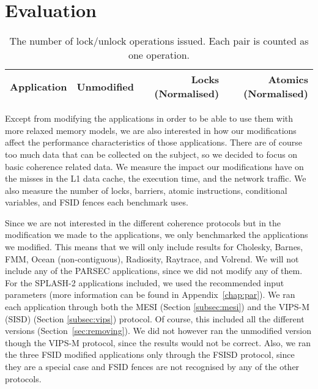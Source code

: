 \chapter{Evaluation}
\label{chap:results}

\begin{table}[b]
	\begin{centering}
		\begin{tabular}{ r | r r r }
			Application & Unmodified & Locks (Normalised) & Atomics (Normalised) \\
			\hline
		\end{tabular}
		\caption{The number of lock/unlock operations issued. Each pair is
		counted as one operation.}
		\label{tab:locks}
	\end{centering}
\end{table}

Except from modifying the applications in order to be able to use them with more
relaxed memory models, we are also interested in how our modifications affect
the performance characteristics of those applications. There are of course too
much data that can be collected on the subject, so we decided to focus on basic
coherence related data. We measure the impact our modifications have on the
misses in the L1 data cache, the execution time, and the network traffic. We
also measure the number of locks, barriers, atomic instructions, conditional
variables, and FSID fences each benchmark uses.

Since we are not interested in the different coherence protocols but in the
modification we made to the applications, we only benchmarked the applications
we modified. This means that we will only include results for Cholesky, Barnes,
FMM, Ocean (non-contiguous), Radiosity, Raytrace, and Volrend. We will not
include any of the PARSEC applications, since we did not modify any of them. For
the SPLASH-2 applications included, we used the recommended input parameters
\cite{woo1995splash} (more information can be found in Appendix~\ref{chap:par}).
We ran each application through both the MESI (Section \ref{subsec:mesi}) and
the VIPS-M (SISD) (Section \ref{subsec:vips}) protocol.  Of course, this
included all the different versions (Section~\ref{sec:removing}). We did not
however ran the unmodified version though the VIPS-M protocol, since the results
would not be correct.  Also, we ran the three FSID modified applications only
through the FSISD protocol, since they are a special case and FSID fences are
not recognised by any of the other protocols.

